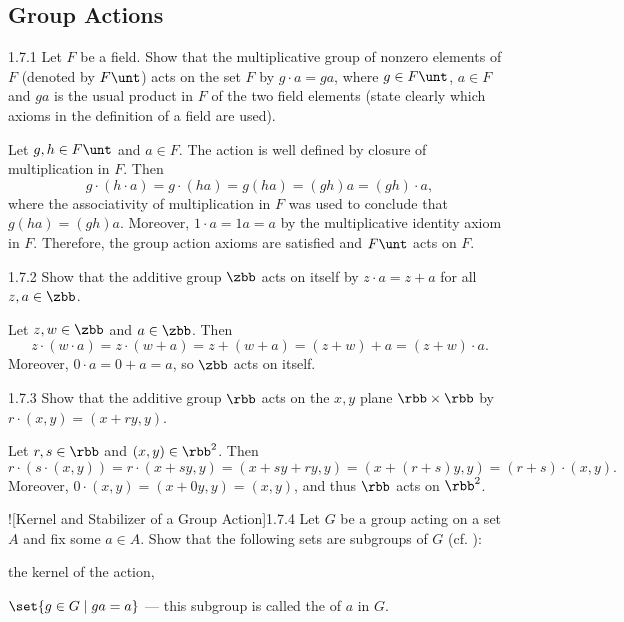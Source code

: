 \subsection{Group Actions}

\begin{exercise}{1.7.1}
    Let $F$ be a field.
	Show that the multiplicative group of nonzero elements of $F$ (denoted by $F\unt$) acts on the set $F$ by $g\cdot a = g a$, where $g\in F\unt$, $a\in F$ and $ga$ is the usual product in $F$ of the two field elements (state clearly which axioms in the definition of a field are used). 
\end{exercise}

\begin{sol}
    Let $g, h \in F\unt$ and $a \in F$.
	The action is well defined by closure of multiplication in $F$.
    Then
    \[
    	g \cdot (h \cdot a) = g \cdot (ha) = g(ha) = (gh)a = (gh) \cdot a,
    \]
    where the associativity of multiplication in $F$ was used to conclude that $g(ha) = (gh)a$.
	Moreover, $1 \cdot a = 1a = a$ by the multiplicative identity axiom in $F$.
	Therefore, the group action axioms are satisfied and $F\unt$ acts on $F$.
\end{sol}

\begin{exercise}{1.7.2}
    Show that the additive group $\zbb$ acts on itself by $z\cdot a = z + a$ for all $z,a\in\zbb$.
\end{exercise}

\begin{sol}
    Let $z, w \in \zbb$ and $a \in \zbb$.
	Then
    \[
    	z \cdot (w \cdot a) = z \cdot (w + a) = z + (w + a) = (z + w) + a = (z + w) \cdot a.
    \]
    Moreover, $0 \cdot a = 0 + a = a$, so $\zbb$ acts on itself.
\end{sol}

\begin{exercise}{1.7.3}
    Show that the additive group $\rbb$ acts on the $x,y$ plane $\rbb\times\rbb$ by $r\cdot (x,y) = (x + ry, y)$.
\end{exercise}

\begin{sol}
    Let $r, s \in \rbb$ and $(x, y) \in \rbb^2$.
	Then
    \[
    	r \cdot (s \cdot (x, y)) = r \cdot (x + sy, y) = (x + sy + ry, y) = (x + (r + s)y, y) = (r + s) \cdot (x, y).
    \]
    Moreover, $0 \cdot (x, y) = (x + 0y, y) = (x, y)$, and thus $\rbb$ acts on $\rbb^2$.
\end{sol}

\begin{exercise}![Kernel and Stabilizer of a Group Action]{1.7.4}
    Let $G$ be a group acting on a set $A$ and fix some $a\in A$.
	Show that the following sets are subgroups of $G$ (cf. ):
    \begin{subexercises}
        \item the kernel of the action,
        \item $\set{g\in G \mid g a = a}$ --- this subgroup is called the  of $a$ in $G$.
    \end{subexercises}
\end{exercise}

